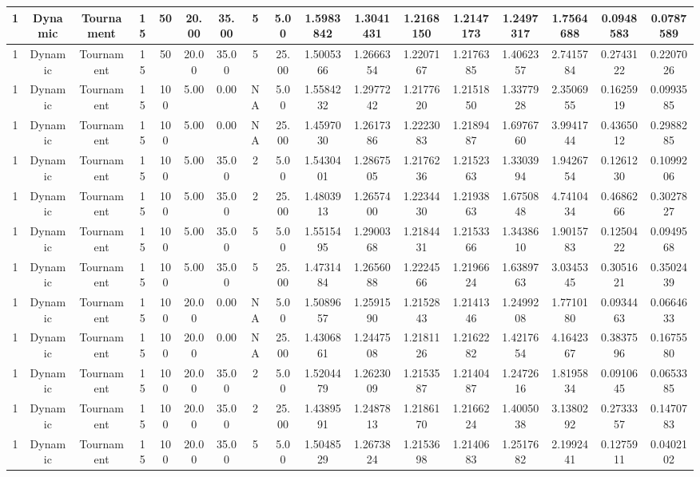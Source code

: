 \documentclass[a4paper]{article}
\begin{document}
\begin{center}
\begin{tabular}{ | c | c | c | c | c | c | c | c | c | c | c | c | c | c | c | c | c | }
		\hline
		1	&	Dynamic	&	Tournament	&	15	&	50	&	20.00	&	35.00	&	5	&	5.00	&	1.5983842	&	1.3041431	&	1.2168150	&	1.2147173	&	1.2497317	&	1.7564688	&	0.0948583	&	0.0787589 \\
		\hline
		1	&	Dynamic	&	Tournament	&	15	&	50	&	20.00	&	35.00	&	5	&	25.00	&	1.5005366	&	1.2666354	&	1.2207167	&	1.2176385	&	1.4062357	&	2.7415784	&	0.2743122	&	0.2207026 \\
		\hline
		1	&	Dynamic	&	Tournament	&	15	&	100	&	5.00	&	0.00	&	NA	&	5.00	&	1.5584232	&	1.2977242	&	1.2177620	&	1.2151850	&	1.3377928	&	2.3506955	&	0.1625919	&	0.0993585 \\
		\hline
		1	&	Dynamic	&	Tournament	&	15	&	100	&	5.00	&	0.00	&	NA	&	25.00	&	1.4597030	&	1.2617386	&	1.2223083	&	1.2189487	&	1.6976760	&	3.9941744	&	0.4365012	&	0.2988285 \\
		\hline
		1	&	Dynamic	&	Tournament	&	15	&	100	&	5.00	&	35.00	&	2	&	5.00	&	1.5430401	&	1.2867505	&	1.2176236	&	1.2152363	&	1.3303994	&	1.9426754	&	0.1261230	&	0.1099206 \\
		\hline
		1	&	Dynamic	&	Tournament	&	15	&	100	&	5.00	&	35.00	&	2	&	25.00	&	1.4803913	&	1.2657400	&	1.2234430	&	1.2193863	&	1.6750848	&	4.7410434	&	0.4686266	&	0.3027827 \\
		\hline
		1	&	Dynamic	&	Tournament	&	15	&	100	&	5.00	&	35.00	&	5	&	5.00	&	1.5515495	&	1.2900368	&	1.2184431	&	1.2153366	&	1.3438610	&	1.9015783	&	0.1250422	&	0.0949568 \\
		\hline
		1	&	Dynamic	&	Tournament	&	15	&	100	&	5.00	&	35.00	&	5	&	25.00	&	1.4731484	&	1.2656088	&	1.2224566	&	1.2196624	&	1.6389763	&	3.0345345	&	0.3051621	&	0.3502439 \\
		\hline
		1	&	Dynamic	&	Tournament	&	15	&	100	&	20.00	&	0.00	&	NA	&	5.00	&	1.5089657	&	1.2591590	&	1.2152843	&	1.2141346	&	1.2499208	&	1.7710180	&	0.0934463	&	0.0664633 \\
		\hline
		1	&	Dynamic	&	Tournament	&	15	&	100	&	20.00	&	0.00	&	NA	&	25.00	&	1.4306861	&	1.2447508	&	1.2181126	&	1.2162282	&	1.4217654	&	4.1642367	&	0.3837596	&	0.1675580 \\
		\hline
		1	&	Dynamic	&	Tournament	&	15	&	100	&	20.00	&	35.00	&	2	&	5.00	&	1.5204479	&	1.2623009	&	1.2153587	&	1.2140487	&	1.2472616	&	1.8195834	&	0.0910645	&	0.0653385 \\
		\hline
		1	&	Dynamic	&	Tournament	&	15	&	100	&	20.00	&	35.00	&	2	&	25.00	&	1.4389591	&	1.2487813	&	1.2186170	&	1.2166224	&	1.4005038	&	3.1380292	&	0.2733357	&	0.1470783 \\
		\hline
		1	&	Dynamic	&	Tournament	&	15	&	100	&	20.00	&	35.00	&	5	&	5.00	&	1.5048529	&	1.2673824	&	1.2153698	&	1.2140683	&	1.2517682	&	2.1992441	&	0.1275911	&	0.0402102 \\

\end{tabular}
\end{center}
\end{document}

